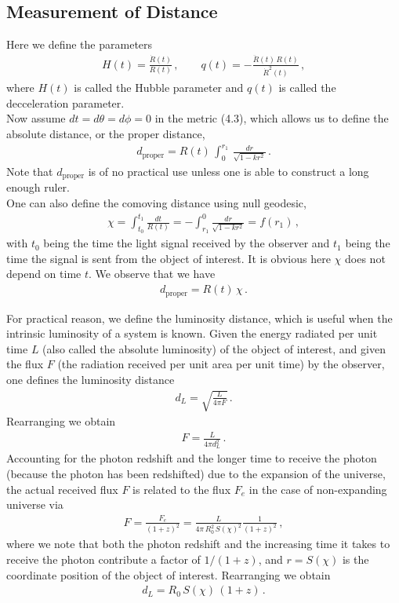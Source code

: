 \documentclass[11pt, onesided]{book}
\theoremstyle{break}
\theoremstyle{break}
\begin{document}
\subsection{Measurement of Distance}
Here we define the parameters
\begin{align*}
H(t) = \frac{\dot{R}(t)}{R(t)}\,,\qquad
q(t) = -\frac{\ddot{R}(t)\, R(t)}{\dot{R}^2(t)}\,,
\end{align*}
where $H(t)$ is called the Hubble parameter and $q(t)$ is called the decceleration parameter.\\

Now assume $dt = d\theta = d\phi = 0$ in the metric (4.3), which allows us to define the absolute distance, or the proper distance,
\begin{align*}
d_{\text{proper}} = R(t) \, \int_0^{r_1} \,\frac{dr}{\sqrt{1 - kr^2}}\,.
\end{align*}
Note that $d_{\text{proper}}$ is of no practical use unless one is able to construct a long enough ruler.\\

One can also define the comoving distance using null geodesic, 
\begin{align*}
\chi = \int_{t_0}^{t_1} \frac{dt}{R(t)} =-\int_{r_1}^0 \frac{dr}{\sqrt{1-kr^2}} = f(r_1)\,,
\end{align*}
with $t_0$ being the time the light signal received by the observer and $t_1$ being the time the signal is sent from the object of interest. It is obvious here $\chi$ does not depend on time $t$. We observe that we have
\begin{align*}
d_{\text{proper}} = R(t)\, \chi\,. 
\end{align*}

For practical reason, we define the luminosity distance, which is useful when the intrinsic luminosity of a system is known. Given the energy radiated per unit time $L$ (also called the absolute luminosity) of the object of interest, and given the flux $F$  (the radiation received per unit area per unit time) by the observer, one defines the luminosity distance
\begin{align*}
d_L = \sqrt{\frac{L}{4\pi F}}\,.
\end{align*}
Rearranging we obtain
\begin{align*}
F = \frac{L}{4\pi d_L^2}\,.
\end{align*}
Accounting for the photon redshift and the longer time to receive the photon (because the photon has been redshifted) due to the expansion of the universe, the actual received flux $F$ is related to the flux $F_e$ in the case of non-expanding universe via
\begin{align*}
F = \frac{F_e}{(1+z)^2} = \frac{L}{4\pi\, R_0^2\, S(\chi)^2 }\frac{1}{(1+z)^2} \,,
\end{align*}
where we note that both the photon redshift and the increasing time it takes to receive the photon contribute a factor of $1/(1+z)$, and $r= S(\chi)$ is the coordinate position of the object of interest. Rearranging we obtain
\begin{align*}
d_L = R_0\, S(\chi) \, (1+z)\,.
\end{align*}
\end{document}
